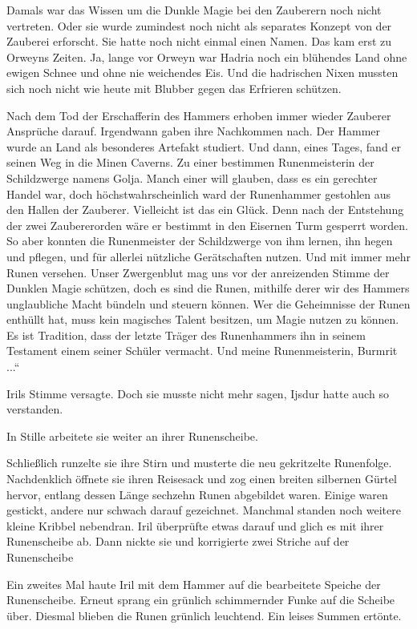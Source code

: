 Damals war das Wissen um die Dunkle Magie bei den Zauberern noch nicht vertreten. Oder sie wurde zumindest noch nicht als separates Konzept von der Zauberei erforscht. Sie hatte noch nicht einmal einen Namen. Das kam erst zu Orweyns Zeiten. Ja, lange vor Orweyn war Hadria noch ein blühendes Land ohne ewigen Schnee und ohne nie weichendes Eis. Und die hadrischen Nixen mussten sich noch nicht wie heute mit Blubber gegen das Erfrieren schützen.

Nach dem Tod der Erschafferin des Hammers erhoben immer wieder Zauberer Ansprüche darauf. Irgendwann gaben ihre Nachkommen nach. Der Hammer wurde an Land als besonderes Artefakt studiert. Und dann, eines Tages, fand er seinen Weg in die Minen Caverns. Zu einer bestimmen Runenmeisterin der Schildzwerge namens Golja. Manch einer will glauben, dass es ein gerechter Handel war, doch höchstwahrscheinlich ward der Runenhammer gestohlen aus den Hallen der Zauberer. Vielleicht ist das ein Glück. Denn nach der Entstehung der zwei Zaubererorden wäre er bestimmt in den Eisernen Turm gesperrt worden. So aber konnten die Runenmeister der Schildzwerge von ihm lernen, ihn hegen und pflegen, und für allerlei nützliche Gerätschaften nutzen. Und mit immer mehr Runen versehen. Unser Zwergenblut mag uns vor der anreizenden Stimme der Dunklen Magie schützen, doch es sind die Runen, mithilfe derer wir des Hammers unglaubliche Macht bündeln und steuern können. Wer die Geheimnisse der Runen enthüllt hat, muss kein magisches Talent besitzen, um Magie nutzen zu können. Es ist Tradition, dass der letzte Träger des Runenhammers ihn in seinem Testament einem seiner Schüler vermacht. Und meine Runenmeisterin, Burmrit ...“

Irils Stimme versagte. Doch sie musste nicht mehr sagen, Ijsdur hatte auch so verstanden.

In Stille arbeitete sie weiter an ihrer Runenscheibe.

Schließlich runzelte sie ihre Stirn und musterte die neu gekritzelte Runenfolge. Nachdenklich öffnete sie ihren Reisesack und zog einen breiten silbernen Gürtel hervor, entlang dessen Länge sechzehn Runen abgebildet waren. Einige waren gestickt, andere nur schwach darauf gezeichnet. Manchmal standen noch weitere kleine Kribbel nebendran. Iril überprüfte etwas darauf und glich es mit ihrer Runenscheibe ab. Dann nickte sie und korrigierte zwei Striche auf der Runenscheibe

Ein zweites Mal haute Iril mit dem Hammer auf die bearbeitete Speiche der Runenscheibe. Erneut sprang ein grünlich schimmernder Funke auf die Scheibe über. Diesmal blieben die Runen grünlich leuchtend. Ein leises Summen ertönte.

